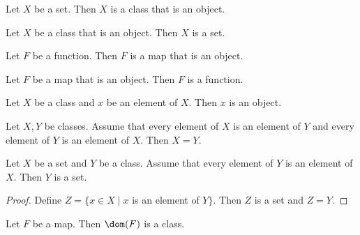 


\begin{forthel}

  \begin{lemma}
    Let $X$ be a set.
    Then $X$ is a class that is an object.
  \end{lemma}

  \begin{lemma}
    Let $X$ be a class that is an object.
    Then $X$ is a set.
  \end{lemma}



  \begin{lemma}
    Let $F$ be a function.
    Then $F$ is a map that is an object.
  \end{lemma}

  \begin{lemma}
    Let $F$ be a map that is an object.
    Then $F$ is a function.
  \end{lemma}



  \begin{lemma}
    Let $X$ be a class and $x$ be an element of $X$.
    Then $x$ is an object.
  \end{lemma}

  \begin{lemma}
    Let $X, Y$ be classes.
    Assume that every element of $X$ is an element of $Y$ and every element of
    $Y$ is an element of $X$.
    Then $X = Y$.
  \end{lemma}

  \begin{lemma}
    Let $X$ be a set and $Y$ be a class.
    Assume that every element of $Y$ is an element of $X$.
    Then $Y$ is a set.
  \end{lemma}
  \begin{proof}
    Define $Z = \{ x \in X \mid x$ is an element of $Y \}$.
    Then $Z$ is a set and $Z = Y$.
  \end{proof}



  \begin{lemma}
    Let $F$ be a map.
    Then $\dom(F)$ is a class.
  \end{lemma}


\end{forthel}
